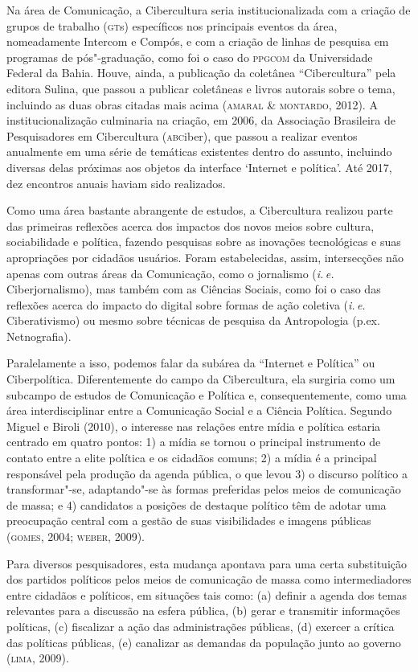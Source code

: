 Na área de Comunicação, a Cibercultura seria institucionalizada com a
criação de grupos de trabalho (\textsc{gt}s) específicos nos principais eventos
da área, nomeadamente Intercom e Compós, e com a criação de linhas de
pesquisa em programas de pós"-graduação, como foi o caso do \textsc{ppgcom} da
Universidade Federal da Bahia. Houve, ainda, a publicação da coletânea
``Cibercultura'' pela editora Sulina, que passou a publicar coletâneas e
livros autorais sobre o tema, incluindo as duas obras citadas mais acima
(\textsc{amaral \& montardo}, 2012). A institucionalização culminaria na criação,
em 2006, da Associação Brasileira de Pesquisadores em Cibercultura
(\textsc{abc}iber), que passou a realizar eventos anualmente em uma série de
temáticas existentes dentro do assunto, incluindo diversas delas
próximas aos objetos da interface `Internet e política'. Até 2017, dez
encontros anuais haviam sido realizados.

Como uma área bastante abrangente de estudos, a Cibercultura realizou
parte das primeiras reflexões acerca dos impactos dos novos meios sobre
cultura, sociabilidade e política, fazendo pesquisas sobre as inovações
tecnológicas e suas apropriações por cidadãos usuários. Foram
estabelecidas, assim, intersecções não apenas com outras áreas da
Comunicação, como o jornalismo (\textit{i.\,e.} Ciberjornalismo), mas também com as
Ciências Sociais, como foi o caso das reflexões acerca do impacto do
digital sobre formas de ação coletiva (\textit{i.\,e.} Ciberativismo) ou mesmo
sobre técnicas de pesquisa da Antropologia (p.ex. Netnografia).

Paralelamente a isso, podemos falar da subárea da ``Internet e
Política'' ou Ciberpolítica. Diferentemente do campo da Cibercultura,
ela surgiria como um subcampo de estudos de Comunicação e Política e,
consequentemente, como uma área interdisciplinar entre a Comunicação
Social e a Ciência Política. Segundo Miguel e Biroli (2010), o interesse
nas relações entre mídia e política estaria centrado em quatro pontos:
1) a mídia se tornou o principal instrumento de contato entre a elite
política e os cidadãos comuns; 2) a mídia é a principal responsável pela
produção da agenda pública, o que levou 3) o discurso político a
transformar"-se, adaptando"-se às formas preferidas pelos meios de
comunicação de massa; e 4) candidatos a posições de destaque político
têm de adotar uma preocupação central com a gestão de suas visibilidades
e imagens públicas (\textsc{gomes}, 2004; \textsc{weber}, 2009).

Para diversos pesquisadores, esta mudança apontava para uma certa
substituição dos partidos políticos pelos meios de comunicação de massa
como intermediadores entre cidadãos e políticos, em situações tais como:
(a) definir a agenda dos temas relevantes para a discussão na esfera
pública, (b) gerar e transmitir informações políticas, (c) fiscalizar a
ação das administrações públicas, (d) exercer a crítica das políticas
públicas, (e) canalizar as demandas da população junto ao governo (\textsc{lima},
2009).

